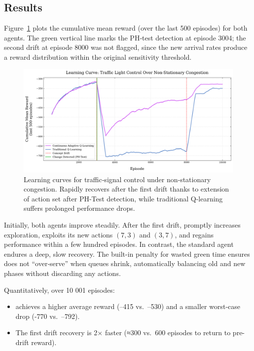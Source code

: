 \subsection{Results}
Figure~\ref{fig:traffic-learning-curve} plots the cumulative mean reward (over the last 500 episodes) for both agents. The green vertical line marks the PH‐test detection at episode 3004; the second drift at episode 8000 was not flagged, since the new arrival rates produce a reward distribution within the original sensitivity threshold.

\begin{figure}
    \centering
    \includegraphics[width=\textwidth]{figures/traffic_learning_curve.png}
    \caption{Learning curves for traffic‐signal control under non‐stationary congestion. Rapidly recovers after the first drift thanks to extension of action set after PH-Test detection, while traditional Q-learning suffers prolonged performance drops.}
    \label{fig:traffic-learning-curve}
\end{figure}

Initially, both agents improve steadily. After the first drift, \adaptiverl promptly increases exploration, exploits its new actions $(7,3)$ and $(3,7)$, and regains performance within a few hundred episodes. In contrast, the standard agent endures a deep, slow recovery. The built-in penalty for wasted green time ensures \adaptiverl does not “over‐serve” when queues shrink, automatically balancing old and new phases without discarding any actions.

Quantitatively, over 10 001 episodes:
\begin{itemize}
  \item \adaptiverl achieves a higher average reward (–415 vs.\ –530) and a smaller worst‐case drop (-770 vs.\ –792).
  \item The first drift recovery is 2× faster (≈300 vs.\ 600 episodes to return to pre-drift reward).
\end{itemize}

